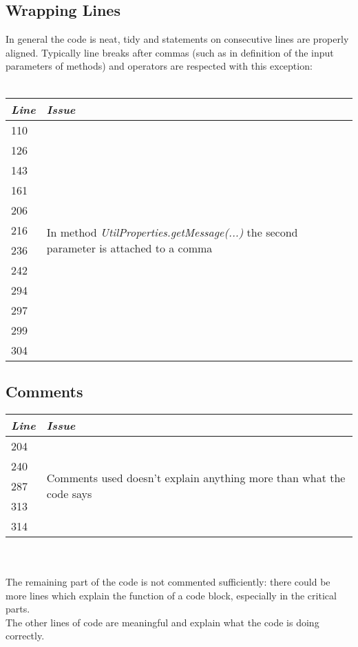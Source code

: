 \documentclass[11pt,a4paper]{report}
\begin{document}
\subsection{Wrapping Lines}
In general the code is neat, tidy and statements on consecutive lines are properly aligned. Typically line breaks after commas (such as in definition of the input parameters of methods) and operators are respected with this exception:
\\\\
\begin{tabularx}{\textwidth}{|l|X|}
	\hline
	\textit{Line} & \textit{Issue}\\
	\hline
	\hline
	110 & \multirow{12}{\linewidth}{In method \textit{UtilProperties.getMessage(...)} the second parameter is attached to a comma}\\
	126 & \\
	143 & \\
	161 & \\
	206 & \\
	216 & \\
	236 & \\
	242 & \\
	294 & \\
	297 & \\
	299 & \\
	304 & \\
	\hline
\end{tabularx}
\subsection{Comments}
\begin{tabularx}{\textwidth}{|l|X|}
	\hline
	\textit{Line} & \textit{Issue}\\
	\hline
	\hline
	204 & \multirow{5}{\linewidth}{Comments used doesn't explain anything more than what the code says}\\
	240 & \\
	287 & \\
	313 & \\
	314 & \\
	\hline
\end{tabularx}
\\\\
The remaining part of the code is not commented sufficiently: there could be more lines which explain the function of a code block, especially in the critical parts.\\The other lines of code are meaningful and explain what the code is doing correctly.
\end{document}
